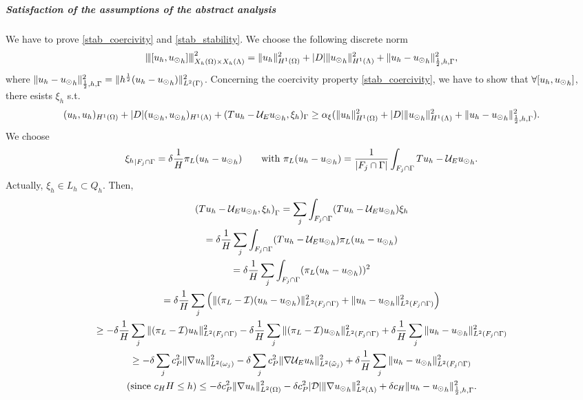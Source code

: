 \subparagraph{Satisfaction of the assumptions of the 
abstract analysis} 
We have to prove \eqref{stab_coercivity} and \eqref{stab_stability}.
We choose the following discrete norm
\begin{equation*}
{\left\vert\kern-0.25ex\left\vert\kern-0.25ex\left\vert [u_h, {u_{\odot}}_h] \right\vert\kern-0.25ex\right\vert\kern-0.25ex\right\vert}^2_{X_h(\Omega)\times X_h(\Lambda) }
= \|u_h\|^2_{H^1(\Omega)}+|D|\|{u_{\odot}}_h\|^2_{H^1(\Lambda)} + \|u_h - {u_{\odot}}_h\|^2_{\frac 12, h, \Gamma},
\end{equation*}
where $\|u_h - {u_{\odot}}_h\|^2_{\frac 12, h, \Gamma} = \|h^{\frac 12} (u_h - {u_{\odot}}_h)\|^2_{L^2(\Gamma)} $.
Concerning the coercivity property \eqref{stab_coercivity}, we have to show that $\forall [u_h, {u_{\odot}}_h]$, there esists $\xi_h$ s.t.
\begin{equation*}
(u_h,u_h)_{H^1(\Omega)}+ |D|({u_{\odot}}_h, {u_{\odot}}_h)_{H^1(\Lambda)} +  (Tu_h -  \mathcal{U}_E {u_{\odot}}_h, \xi_h)_{\Gamma} \geq \alpha_{\xi}(\|u_h\|^2_{H^1(\Omega)}+|D|\|{u_{\odot}}_h\|^2_{H^1(\Lambda)}+ \|u_h - {u_{\odot}}_h\|^2_{\frac 12, h, \Gamma}).
\end{equation*}
We choose 
\begin{equation*}
{\xi_h}_{|F_j\cap \Gamma}=\delta \frac 1H \pi_L(u_h-{u_{\odot}}_h) \qquad \text{with } \pi_L(u_h-{u_{\odot}}_h) =\frac{1}{|F_j\cap \Gamma|}\int_{F_j\cap \Gamma} Tu_h-\mathcal{U}_E {u_{\odot}}_h.
\end{equation*}
Actually, $\xi_h\in L_h \subset Q_h$. Then,
\begin{multline*}
\left( Tu_h - \mathcal{U}_E{u_{\odot}}_h, \xi _h \right)_{\Gamma} 
= \sum_j \int_{F_j\cap \Gamma} ( Tu_h - \mathcal{U}_E{u_{\odot}}_h)\xi_h
\\
= \delta \frac{1}{H} \sum_j \int_{F_j\cap \Gamma} ( Tu_h - \mathcal{U}_E{u_{\odot}}_h) \pi_L(u_h - {u_{\odot}}_h)
\\
=\delta \frac{1}{H} \sum_j \int_{F_j\cap \Gamma}  (\pi_L(u_h - {u_{\odot}}_h))^2
\\
=\delta \frac{1}{H} \sum_j \left(\|(\pi_L - \mathcal{I})(u_h-{u_{\odot}}_h)\|^2_{L^2(F_j\cap \Gamma)}  + \|u_h-{u_{\odot}}_h\|^2_{L^2(F_j\cap \Gamma)} \right)
\\
\geq -\delta \frac 1H \sum_j \|(\pi_L - \mathcal{I})u_h\|^2_{L^2(F_j\cap \Gamma)}
- \delta \frac 1H \sum_j \|(\pi_L - \mathcal{I}){u_{\odot}}_h\|^2_{L^2(F_j\cap \Gamma)} 
+ \delta \frac 1H \sum_j \|u_h-{u_{\odot}}_h\|^2_{L^2(F_j\cap \Gamma)}
\\
\geq -\delta \sum_j c_P^2 \|\nabla u_h\|^2_{L^2(\omega_j)}
- \delta \sum_j c_P^2 \|\nabla  \mathcal{U}_E u_h\|^2_{L^2(\tilde{\omega}_j)}
+ \delta \frac 1H \sum_j \|u_h-{u_{\odot}}_h\|^2_{L^2(F_j\cap \Gamma)}
\\
(\text{since }c_H H \leq h ) \leq -\delta c_P^2 \|\nabla u_h\|^2_{L^2(\Omega)} - \delta c_P^2 |\mathcal{D}|\|\nabla {u_{\odot}}_h\|^2_{L^2(\Lambda)} + \delta c_H \|u_h-{u_{\odot}}_h\|^2_{\frac 12,h,\Gamma}. 
\end{multline*}
